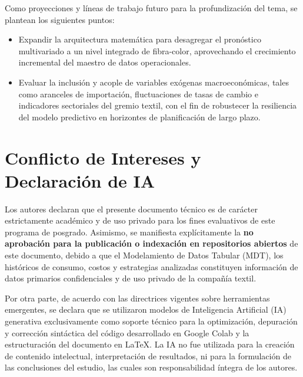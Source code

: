 \documentclass[conference,twoside]{IEEEtran}
\begin{document}
Como proyecciones y líneas de trabajo futuro para la profundización del tema, se plantean los siguientes puntos:
\begin{itemize}
    \item Expandir la arquitectura matemática para desagregar el pronóstico multivariado a un nivel integrado de fibra-color, aprovechando el crecimiento incremental del maestro de datos operacionales.
    \item Evaluar la inclusión y acople de variables exógenas macroeconómicas, tales como aranceles de importación, fluctuaciones de tasas de cambio e indicadores sectoriales del gremio textil, con el fin de robustecer la resiliencia del modelo predictivo en horizontes de planificación de largo plazo.
\end{itemize}



\section*{Conflicto de Intereses y Declaración de IA}
\label{sec:conflictos_ia}

Los autores declaran que el presente documento técnico es de carácter estrictamente académico y de uso privado para los fines evaluativos de este programa de posgrado. Asimismo, se manifiesta explícitamente la \textbf{no aprobación para la publicación o indexación en repositorios abiertos} de este documento, debido a que el Modelamiento de Datos Tabular (MDT), los históricos de consumo, costos y estrategias analizadas constituyen información de datos primarios confidenciales y de uso privado de la compañía textil. 

Por otra parte, de acuerdo con las directrices vigentes sobre herramientas emergentes, se declara que se utilizaron modelos de Inteligencia Artificial (IA) generativa exclusivamente como soporte técnico para la optimización, depuración y corrección sintáctica del código desarrollado en Google Colab y la estructuración del documento en \LaTeX. La IA no fue utilizada para la creación de contenido intelectual, interpretación de resultados, ni para la formulación de las conclusiones del estudio, las cuales son responsabilidad íntegra de los autores.


\appendices

\renewcommand{\thesection}{\Alph{section}}
\end{document}
